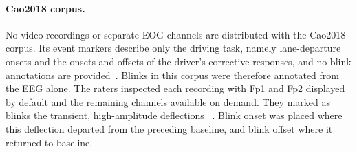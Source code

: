 \paragraph{Cao2018 corpus.}
No video recordings or separate EOG channels are distributed with the Cao2018 corpus. Its event markers describe only the driving task, namely lane-departure onsets and the onsets and offsets of the driver's corrective responses, and no blink annotations are provided~\citep{cao2019multichannel}. Blinks in this corpus were therefore annotated from the EEG alone. The raters inspected each recording with Fp1 and Fp2 displayed by default and the remaining channels available on demand. They marked as blinks the transient, high-amplitude deflections ~\citep{iwasaki2005effects,croft2000removal,kleifges2017blinker}. Blink onset was placed where this deflection departed from the preceding baseline, and blink offset where it returned to baseline.
